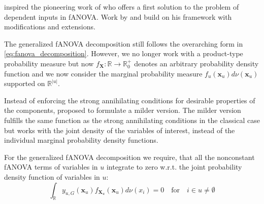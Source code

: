 \citet{stone1994} inspired the pioneering work of \citet{hooker2007} who offers a first solution to the problem of dependent inputs in fANOVA. Work by \cite{chastaing2012} and \cite{rahman2014} build on his framework with modifications and extensions.\par
The generalized fANOVA decomposition still follows the overarching form in \autoref{eq:fanova_decomposition}.
However, we no longer work with a product-type probability measure but now $f_{\boldsymbol{X}}: \mathbb{R} \rightarrow \mathbb{R}_{0}^{+}$ denotes an arbitrary probability density function
and we now consider the marginal probability measure $f_{u}(\boldsymbol{x}_u)d\nu(\boldsymbol{x}_u)$ supported on $\mathbb{R}^{|u|}$.\par

Instead of enforcing the strong annihilating conditions for desirable properties of the components, \cite{rahman2014} proposed to formulate a milder version.
The milder version fulfills the same function as the strong annihilating conditions in the classical case but works with the joint density of the variables of interest, instead of the individual marginal probability density functions.
\begin{condition}\label{cond:weak_annihilating_conditions}
    For the generalized fANOVA decomposition we require, that all the nonconstant fANOVA terms of variables in $u$ integrate to zero w.r.t. the joint probability density function of variables in $u$:
\begin{equation}
    \int_{\mathbb{R}} y_{u, G}(\boldsymbol{x}_u) f_{\boldsymbol{X}_u}(\boldsymbol{x}_u) d\nu (x_i) = 0 \quad \text{for} \quad i \in u \neq \emptyset
\end{equation}
\end{condition}



